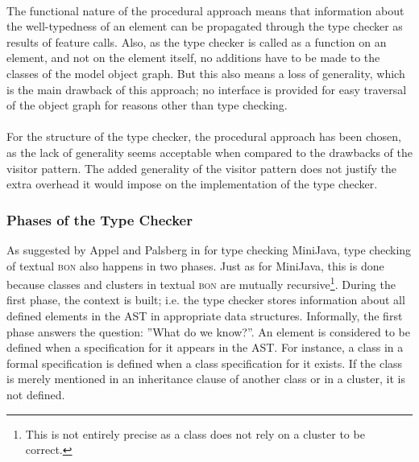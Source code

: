\paragraph{} The functional nature of the procedural approach means that information about the well-typedness of an element can be propagated through the type checker as results of feature calls. Also, as the type checker is called as a function on an element, and not on the element itself, no additions have to be made to the classes of the model object graph. But this also means a loss of generality, which is the main drawback of this approach; no interface is provided for easy traversal of the object graph for reasons other than type checking.
\paragraph{} For the structure of the type checker, the procedural approach has been chosen, as the lack of generality seems acceptable when compared to the drawbacks of the visitor pattern. The added generality of the visitor pattern does not justify the extra overhead it would impose on the implementation of the type checker.

\subsubsection	{Phases of the Type Checker}
\label{design-phases}
As suggested by Appel and Palsberg in \cite[section~5.2]{appel2004} for type checking MiniJava, type checking of textual \textsc{bon} also happens in two phases. Just as for MiniJava, this is done because classes and clusters in textual \textsc{bon} are mutually recursive\footnote{This is not entirely precise as a class does not rely on a cluster to be correct.}.
During the first phase, the context is built; i.e. the type checker stores information about all defined elements in the AST in appropriate data structures. Informally, the first phase answers the question: ''What do we know?''. An element is considered to be defined when a specification for it appears in the AST. For instance, a class in a formal specification is defined when a class specification for it exists. If the class is merely mentioned in an inheritance clause of another class or in a cluster, it is not defined.
